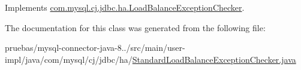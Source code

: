 Implements \mbox{\hyperlink{interfacecom_1_1mysql_1_1cj_1_1jdbc_1_1ha_1_1_load_balance_exception_checker_a5d8bf713d492a85c62b52278437c4e60}{com.\+mysql.\+cj.\+jdbc.\+ha.\+Load\+Balance\+Exception\+Checker}}.



The documentation for this class was generated from the following file\+:\begin{DoxyCompactItemize}
\item 
pruebas/mysql-\/connector-\/java-\/8../src/main/user-\/impl/java/com/mysql/cj/jdbc/ha/\mbox{\hyperlink{_standard_load_balance_exception_checker_8java}{Standard\+Load\+Balance\+Exception\+Checker.\+java}}\end{DoxyCompactItemize}
